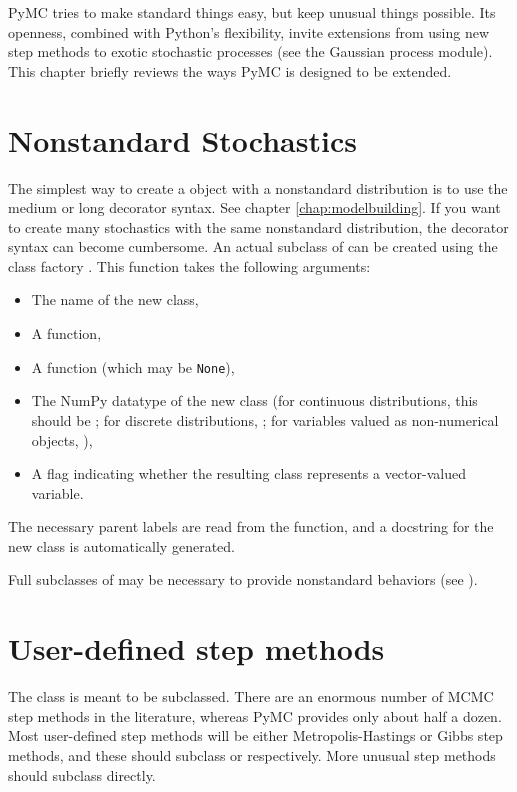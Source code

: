 PyMC tries to make standard things easy, but keep unusual things possible. Its openness, combined with Python's flexibility, invite extensions from using new step methods to exotic stochastic processes (see the Gaussian process module). This chapter briefly reviews the ways PyMC is designed to be extended.


\section{Nonstandard Stochastics} \label{nonstandard}


The simplest way to create a  object with a nonstandard distribution is to use the medium or long decorator syntax. See chapter \ref{chap:modelbuilding}. If you want to create many stochastics with the same nonstandard distribution, the decorator syntax can become cumbersome. An actual subclass of  can be created using the class factory . This function takes the following arguments:
\begin{itemize}
   \item The name of the new class,
   \item A  function,
   \item A  function (which may be \texttt{None}),
   \item The NumPy datatype of the new class (for continuous distributions, this should be ; for discrete distributions, ; for variables valued as non-numerical objects, ),
   \item A flag indicating whether the resulting class represents a vector-valued variable.
\end{itemize}
The necessary parent labels are read from the  function, and a docstring for the new class is automatically generated.

Full subclasses of  may be necessary to provide nonstandard behaviors (see ).


\section{User-defined step methods} \label{custom-stepper}

The  class is meant to be subclassed. There are an enormous number of MCMC step methods in the literature, whereas PyMC provides only about half a dozen. Most user-defined step methods will be either Metropolis-Hastings or Gibbs step methods, and these should subclass  or  respectively. More unusual step methods should subclass  directly.



